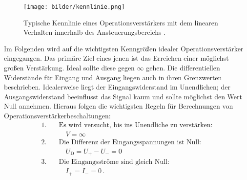 \begin{figure}[H]
  \centering
  \texttt{[image: bilder/kennlinie.png]}
  \caption{Typische Kennlinie eines Operationsverstärkers mit dem linearen Verhalten innerhalb des Ansteuerungsbereichs \cite{anleitung}.}
  \label{kennlinie}
\end{figure}

Im Folgenden wird auf die wichtigsten Kenngrößen idealer Operationsverstärker eingegangen.
Das primäre Ziel eines jenen ist das Erreichen einer möglichst großen Verstärkung. Ideal sollte diese gegen $\infty$ gehen.
Die differentiellen Widerstände für Eingang und Ausgang liegen auch in ihren Grenzwerten beschrieben.
Idealerweise liegt der Eingangswiderstand im Unendlichen; der Ausgangswiderstand beeinflusst das Signal kaum und sollte möglichst den Wert Null annehmen.
Hieraus folgen die wichtigsten Regeln für Berechnungen von Operationsverstärkerbeschaltungen:
\begin{align*}
1.\quad& \text{Es wird versucht, bis ins Unendliche zu verstärken:}\\
&\quad V=\infty\\
2.\quad& \text{Die Differenz der Eingangsspannungen ist Null:}\\
&\quad U_\text{D}=U_+-U_-=0\\
3.\quad& \text{Die Eingangsströme sind gleich Null:}\\
&\quad I_+=I_-=0\,.
\end{align*}
